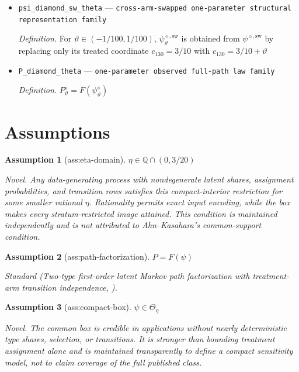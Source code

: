\documentclass{article}
\newtheorem{assumption}{Assumption}
\begin{document}
\begin{itemize}
  \par\smallskip\noindent\emph{Definition.} For \(\vartheta\in(-1/100,1/100)\), \(\psi^{\diamond}_{\vartheta}\) is obtained from \(\psi^{\diamond}\) by replacing only \(c_{130}=3/10\) with \(c_{130}=3/10+\vartheta\)
  \item \texttt{psi\_\allowbreak{}diamond\_\allowbreak{}sw\_\allowbreak{}theta} --- \texttt{cross-\allowbreak{}arm-\allowbreak{}swapped one-\allowbreak{}parameter structural representation family}
  \par\smallskip\noindent\emph{Definition.} For \(\vartheta\in(-1/100,1/100)\), \(\psi^{\diamond,\mathrm{sw}}_{\vartheta}\) is obtained from \(\psi^{\diamond,\mathrm{sw}}\) by replacing only its treated coordinate \(c_{130}=3/10\) with \(c_{130}=3/10+\vartheta\)
  \item \texttt{P\_\allowbreak{}diamond\_\allowbreak{}theta} --- \texttt{one-\allowbreak{}parameter observed full-\allowbreak{}path law family}
  \par\smallskip\noindent\emph{Definition.} \(P^{\diamond}_{\vartheta}=F(\psi^{\diamond}_{\vartheta})\)
\end{itemize}

\section{Assumptions}

\begin{assumption}[ass:eta-domain]\label{ass:eta-domain}
\(\eta\in\mathbb Q\cap(0,3/20)\)
\par\smallskip\noindent\emph{Novel.} Any data-generating process with nondegenerate latent shares, assignment probabilities, and transition rows satisfies this compact-interior restriction for some smaller rational \(\eta\). Rationality permits exact input encoding, while the box makes every stratum-restricted image attained. This condition is maintained independently and is not attributed to Ahn--Kasahara's common-support condition.
\end{assumption}

\begin{assumption}[ass:path-factorization]\label{ass:path-factorization}
\(P=F(\psi)\)
\par\smallskip\noindent\emph{Standard} (Two-type first-order latent Markov path factorization with treatment-arm transition independence, \cite{AhnKasahara2026}).
\end{assumption}

\begin{assumption}[ass:compact-box]\label{ass:compact-box}
\(\psi\in\Theta_\eta\)
\par\smallskip\noindent\emph{Novel.} The common box is credible in applications without nearly deterministic type shares, selection, or transitions. It is stronger than bounding treatment assignment alone and is maintained transparently to define a compact sensitivity model, not to claim coverage of the full published class.
\end{assumption}
\end{document}
